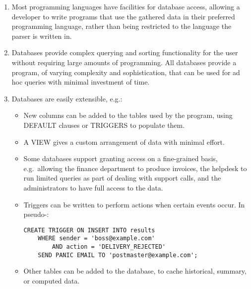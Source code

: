 \begin{enumerate}

    \item Most programming languages have facilities for database access,
        allowing a developer to write programs that use the gathered data
        in their preferred programming language, rather than being
        restricted to the language the parser is written in.

    \item Databases provide complex querying and sorting functionality for
        the user without requiring large amounts of programming.  All
        databases provide a program, of varying complexity and
        sophistication, that can be used for ad hoc queries with minimal
        investment of time.

    \item Databases are easily extensible, e.g.:

        \begin{itemize}

            \item New columns can be added to the tables used by the
                program, using DEFAULT clauses or TRIGGERS to populate
                them.

            \item A VIEW gives a custom arrangement of data with minimal
                effort.

            \item Some databases support granting access on a fine-grained
                basis, e.g.\ allowing the finance department to produce
                invoices, the helpdesk to run limited queries as part of
                dealing with support calls, and the administrators to have
                full access to the data.

            \item Triggers can be written to perform actions when certain
                events occur.  In pseudo-\@:

\begin{verbatim}
CREATE TRIGGER ON INSERT INTO results
    WHERE sender = 'boss@example.com'
        AND action = 'DELIVERY_REJECTED'
    SEND PANIC EMAIL TO 'postmaster@example.com';
\end{verbatim}

            \item Other tables can be added to the database, to cache
                historical, summary, or computed data.


\end{itemize}
\end{enumerate}
